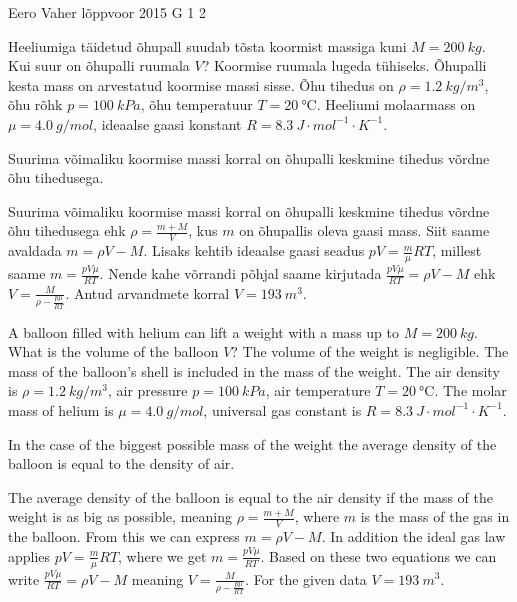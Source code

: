 {Eero Vaher} %
{lõppvoor} %
{2015} %
{G 1} %
{2} %
{
\ifStatement
Heeliumiga täidetud õhupall suudab tõsta koormist massiga kuni $M=\SI{200}{kg}$. Kui suur on õhupalli ruumala $V$? Koormise ruumala lugeda tühiseks. Õhupalli kesta mass on arvestatud koormise massi sisse. Õhu tihedus on $\rho=\SI{1.2}{kg\per m^3}$, õhu rõhk $p=\SI{100}{kPa}$, õhu temperatuur $T=\SI{20}{\celsius}$. Heeliumi molaarmass on $\mu=\SI{4.0}{g\per mol}$, ideaalse gaasi konstant $R=\SI{8.3}{J\cdot mol^{-1}\cdot K^{-1}}$.
\fi


\ifHint
Suurima võimaliku koormise massi korral on õhupalli keskmine tihedus võrdne õhu tihedusega.
\fi


\ifSolution
Suurima võimaliku koormise massi korral on õhupalli keskmine tihedus võrdne õhu tihedusega ehk $\rho=\frac{m+M}{V}$, kus $m$ on õhupallis oleva gaasi mass. Siit saame avaldada $m=\rho V-M$. Lisaks kehtib ideaalse gaasi seadus $pV=\frac{m}{\mu}RT$, millest saame $m=\frac{pV\mu}{RT}$. Nende kahe võrrandi põhjal saame kirjutada $\frac{pV\mu}{RT}=\rho V-M$ ehk $V=\frac{M}{\rho-\frac{p\mu}{RT}}$. Antud arvandmete korral $V=\SI{193}{m^3}$.
\fi


\ifEngStatement
A balloon filled with helium can lift a weight with a mass up to $M=\SI{200}{kg}$. What is the volume of the balloon $V$? The volume of the weight is negligible. The mass of the balloon’s shell is included in the mass of the weight. The air density is $\rho=\SI{1.2}{kg\per m^3}$, air pressure $p=\SI{100}{kPa}$, air temperature $T=\SI{20}{\celsius}$. The molar mass of helium is $\mu=\SI{4.0}{g\per mol}$, universal gas constant is $R=\SI{8.3}{J\cdot mol^{-1}\cdot K^{-1}}$.
\fi


\ifEngHint
In the case of the biggest possible mass of the weight the average density of the balloon is equal to the density of air.
\fi


\ifEngSolution
The average density of the balloon is equal to the air density if the mass of the weight is as big as possible, meaning $\rho=\frac{m+M}{V}$, where $m$ is the mass of the gas in the balloon. From this we can express $m=\rho V-M$. In addition the ideal gas law applies $pV=\frac{m}{\mu}RT$, where we get $m=\frac{pV\mu}{RT}$. Based on these two equations we can write $\frac{pV\mu}{RT}=\rho V-M$ meaning $V=\frac{M}{\rho-\frac{p\mu}{RT}}$. For the given data $V=\SI{193}{m^3}$.
\fi
}